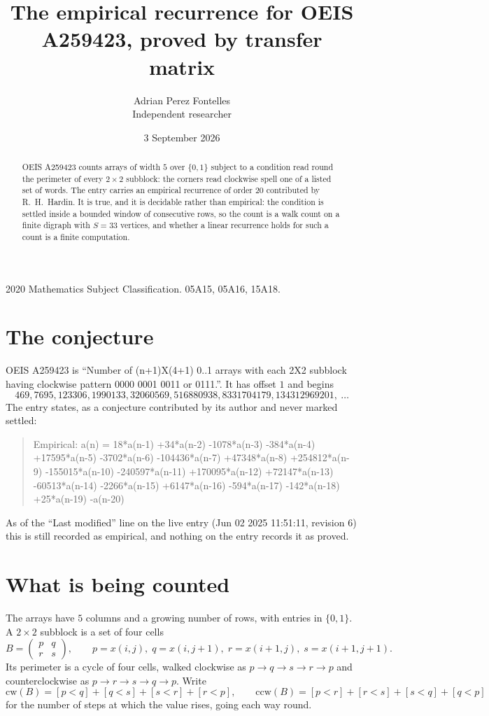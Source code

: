 \documentclass[11pt,a4paper]{article}
\title{The empirical recurrence for OEIS A259423, proved by transfer matrix}
\author{Adrian Perez Fontelles\\ \small Independent researcher}
\date{3 September 2026}
\theoremstyle{plain}
\theoremstyle{definition}
\begin{document}
\maketitle

\begin{abstract}
OEIS A259423 counts arrays of width $5$ over $\{0,1\}$ subject to a condition read round the
perimeter of every $2\times2$ subblock: the corners read clockwise spell one of a listed set of words. The entry carries an empirical recurrence of
order $20$ contributed by R.~H.~Hardin. It is true, and it is decidable rather than
empirical: the condition is settled inside a bounded window of consecutive rows, so the
count is a walk count on a finite digraph with $S=33$ vertices, and whether a linear
recurrence holds for such a count is a finite computation.
\end{abstract}

\noindent\small 2020 Mathematics Subject Classification. 05A15, 05A16, 15A18.\normalsize

\section{The conjecture}

OEIS A259423 is ``Number of (n+1)X(4+1) 0..1 arrays with each 2X2 subblock having clockwise pattern 0000 0001 0011 or 0111.''. It has offset $1$ and begins
\[
469, 7695, 123306, 1990133, 32060569, 516880938, 8331704179, 134312969201,\ \dots
\]
The entry states, as a conjecture contributed by its author and never marked settled:
\begin{quote}
Empirical: a(n) = 18*a(n-1) +34*a(n-2) -1078*a(n-3) -384*a(n-4) +17595*a(n-5) -3702*a(n-6) -104436*a(n-7) +47348*a(n-8) +254812*a(n-9) -155015*a(n-10) -240597*a(n-11) +170095*a(n-12) +72147*a(n-13) -60513*a(n-14) -2266*a(n-15) +6147*a(n-16) -594*a(n-17) -142*a(n-18) +25*a(n-19) -a(n-20)
\end{quote}
As of the ``Last modified'' line on the live entry (Jun 02 2025 11:51:11, revision 6) this is still
recorded as empirical, and nothing on the entry records it as proved.

\section{What is being counted}

The arrays have $5$ columns and a growing number of rows, with entries in $\{0,1\}$. A
$2\times2$ subblock is a set of four cells
\[
B=\begin{pmatrix} p & q \\ r & s \end{pmatrix},
\qquad p=x(i,j),\; q=x(i,j+1),\; r=x(i+1,j),\; s=x(i+1,j+1).
\]
Its perimeter is a cycle of four cells, walked clockwise as $p\to q\to s\to r\to p$ and
counterclockwise as $p\to r\to s\to q\to p$. Write
\[
\mathrm{cw}(B)=[p<q]+[q<s]+[s<r]+[r<p],\qquad
\mathrm{ccw}(B)=[p<r]+[r<s]+[s<q]+[q<p]
\]
for the number of steps at which the value rises, going each way round.
\end{document}
